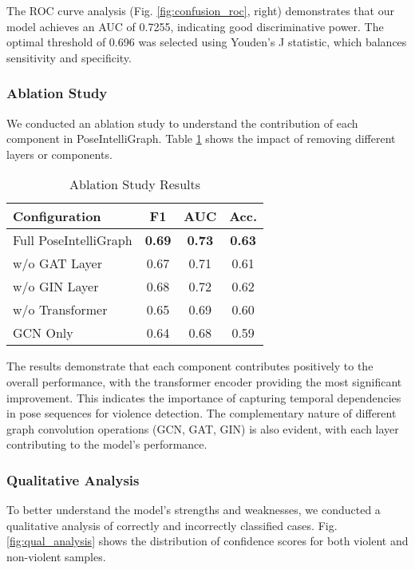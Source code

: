 \documentclass[conference]{IEEEtran}
\begin{document}
The ROC curve analysis (Fig. \ref{fig:confusion_roc}, right) demonstrates that our model achieves an AUC of 0.7255, indicating good discriminative power. The optimal threshold of 0.696 was selected using Youden's J statistic, which balances sensitivity and specificity.

\subsubsection{Ablation Study}
We conducted an ablation study to understand the contribution of each component in PoseIntelliGraph. Table \ref{tab:ablation} shows the impact of removing different layers or components.

\begin{table}[htbp]
\caption{Ablation Study Results}
\begin{center}
\renewcommand{\arraystretch}{1.2}
\begin{tabular}{|l|c|c|c|}
\hline
\rowcolor[gray]{0.9}
\textbf{Configuration} & \textbf{F1} & \textbf{AUC} & \textbf{Acc.} \\
\hline
Full PoseIntelliGraph & \textbf{0.69} & \textbf{0.73} & \textbf{0.63} \\
\hline
w/o GAT Layer & 0.67 & 0.71 & 0.61 \\
\hline
w/o GIN Layer & 0.68 & 0.72 & 0.62 \\
\hline
w/o Transformer & 0.65 & 0.69 & 0.60 \\
\hline
GCN Only & 0.64 & 0.68 & 0.59 \\
\hline
\end{tabular}
\end{center}
\label{tab:ablation}
\end{table}

The results demonstrate that each component contributes positively to the overall performance, with the transformer encoder providing the most significant improvement. This indicates the importance of capturing temporal dependencies in pose sequences for violence detection. The complementary nature of different graph convolution operations (GCN, GAT, GIN) is also evident, with each layer contributing to the model's performance.

\subsubsection{Qualitative Analysis}
To better understand the model's strengths and weaknesses, we conducted a qualitative analysis of correctly and incorrectly classified cases. Fig. \ref{fig:qual_analysis} shows the distribution of confidence scores for both violent and non-violent samples.
\end{document}
